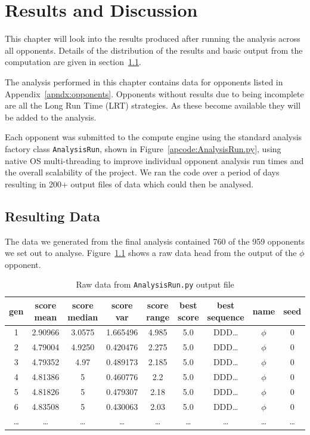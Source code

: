 \chapter{Results and Discussion}\label{ch:results}
This chapter will look into the results produced after running the analysis across all opponents.
Details of the distribution of the results and basic output from the computation are given in section~\ref{sec:descriptive_data}.

The analysis performed in this chapter contains data for opponents listed in Appendix~\ref{apndx:opponents}.
Opponents without results due to being incomplete are all the Long Run Time (LRT) strategies.
As these become available they will be added to the analysis.

Each opponent was submitted to the compute engine using the standard analysis factory class \texttt{AnalysisRun}, shown in Figure~\ref{apcode:AnalysisRun.py}, using native OS multi-threading to improve individual opponent analysis run times and the overall scalability of the project.
We ran the code over a period of days resulting in 200+ output files of data which could then be analysed.

\section{Resulting Data}\label{sec:descriptive_data}
The data we generated from the final analysis contained 760 of the 959 opponents we set out to analyse.
Figure~\ref{table:data_dump} shows a raw data head from the output of the $\phi$ opponent.

\begin{table}[ht]
    \centering
    \begin{tabular}{ccccccccc}
        \toprule
        gen & score mean & score median & score var & score range & best score & best sequence &  name & seed \\
        \midrule
        1 & 2.90966 & 3.0575 & 1.665496 & 4.985 & 5.0 & DDD\ldots & $\phi$ & 0 \\
        2 & 4.79004 & 4.9250 & 0.420476 & 2.275 & 5.0 & DDD\ldots & $\phi$ & 0\\
        3 & 4.79352 & 4.97 & 0.489173 & 2.185 & 5.0 & DDD\ldots & $\phi$ & 0\\
        4 & 4.81386 & 5 & 0.460776 & 2.2 & 5.0 & DDD\ldots & $\phi$ & 0\\
        5 & 4.81826 & 5 & 0.479307 & 2.18 & 5.0 & DDD\ldots & $\phi$ & 0\\
        6 & 4.83508 & 5 & 0.430063 & 2.03 & 5.0 & DDD\ldots & $\phi$ & 0\\
        \ldots & \ldots & \ldots & \ldots & \ldots & \ldots & \ldots & \ldots & \ldots\\        
        \bottomrule
    \end{tabular}
    \caption{Raw data from \texttt{AnalysisRun.py} output file}\label{table:data_dump}
\end{table}


